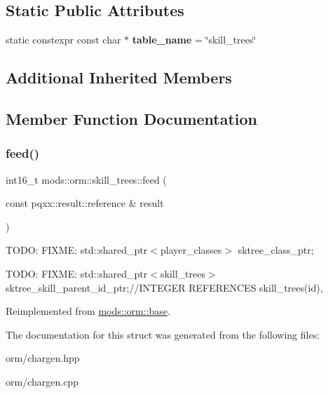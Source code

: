\subsection*{Static Public Attributes}
\begin{DoxyCompactItemize}
\item 
\mbox{\label{structmods_1_1orm_1_1skill__trees_a8383bb4ee7a3939d9eccc91c22d7d9b3}} 
static constexpr const char $\ast$ {\bfseries table\+\_\+name} = \char`\"{}skill\+\_\+trees\char`\"{}
\end{DoxyCompactItemize}
\subsection*{Additional Inherited Members}


\subsection{Member Function Documentation}
\mbox{\label{structmods_1_1orm_1_1skill__trees_af014042f1e7b8c873dcb08135e744b8a}} 
\subsubsection{\texorpdfstring{feed()}{feed()}}
{\footnotesize\ttfamily int16\+\_\+t mods\+::orm\+::skill\+\_\+trees\+::feed (\begin{DoxyParamCaption}\item[{const pqxx\+::result\+::reference \&}]{result }\end{DoxyParamCaption})\hspace{0.3cm}{\ttfamily [virtual]}}

T\+O\+DO\+: F\+I\+X\+ME\+: std\+::shared\+\_\+ptr$<$player\+\_\+classes$>$ sktree\+\_\+class\+\_\+ptr;

T\+O\+DO\+: F\+I\+X\+ME\+: std\+::shared\+\_\+ptr$<$skill\+\_\+trees$>$ sktree\+\_\+skill\+\_\+parent\+\_\+id\+\_\+ptr;//\+I\+N\+T\+E\+G\+ER R\+E\+F\+E\+R\+E\+N\+C\+ES skill\+\_\+trees(id), 

Reimplemented from \hyperlink{structmods_1_1orm_1_1base}{mods\+::orm\+::base}.



The documentation for this struct was generated from the following files\+:\begin{DoxyCompactItemize}
\item 
orm/chargen.\+hpp\item 
orm/chargen.\+cpp\end{DoxyCompactItemize}
